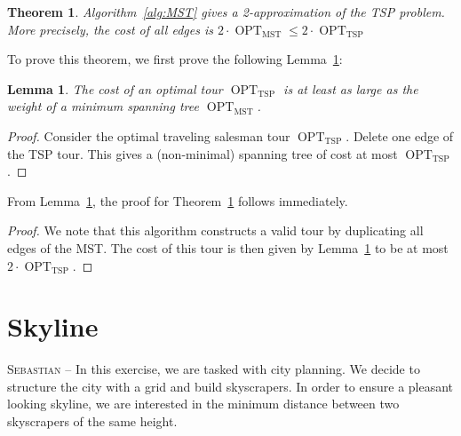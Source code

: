 \documentclass[a4paper,12pt,headsepline]{scrartcl}
\newtheorem{lemma}{Lemma}
\newtheorem{theorem}{Theorem}
\begin{document}
    \begin{theorem}
        Algorithm~\ref{alg:MST} gives a 2-approximation of the TSP problem.
        More precisely, the cost of all edges is $2 \cdot \operatorname{OPT}_{\operatorname{MST}} \leq 2 \cdot \operatorname{OPT}_{\operatorname{TSP}}$
        \label{thm:MST}
    \end{theorem}

    To prove this theorem, we first prove the following Lemma~\ref{lem:TSP_MST}:
    
    \begin{lemma}
        The cost of an optimal tour $\operatorname{OPT}_{\operatorname{TSP}}$ is at least as large as the weight of a minimum spanning tree $\operatorname{OPT}_{\operatorname{MST}}$.
        \label{lem:TSP_MST}
    \end{lemma}
    \begin{proof}
        Consider the optimal traveling salesman tour $\operatorname{OPT}_{\operatorname{TSP}}$.
        Delete one edge of the TSP tour.
        This gives a (non-minimal) spanning tree of cost at most $\operatorname{OPT}_{\operatorname{TSP}}$.
    \end{proof}

    From Lemma~\ref{lem:TSP_MST}, the proof for Theorem~\ref{thm:MST} follows immediately.
    \begin{proof}
        We note that this algorithm constructs a valid tour by duplicating all edges of the MST. The cost of this tour is then given by Lemma~\ref{lem:TSP_MST} to be at most $2 \cdot \operatorname{OPT}_{\operatorname{TSP}}$.
    \end{proof}

    
    \section{Skyline}
    \textsc{Sebastian --}
    In this exercise, we are tasked with city planning.
    We decide to structure the city with a grid and build skyscrapers.
    In order to ensure a pleasant looking skyline, we are interested in the minimum distance between two skyscrapers of the same height.
\end{document}
